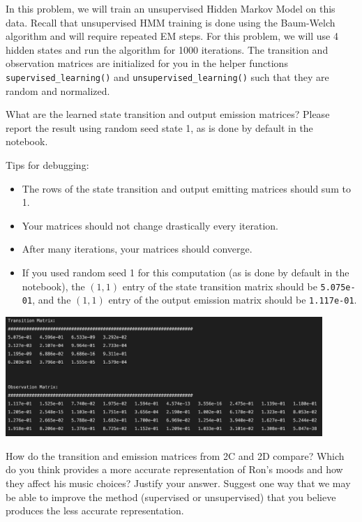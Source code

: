 In this problem, we will train an unsupervised Hidden Markov Model on this data. Recall that unsupervised HMM training is done using the Baum-Welch algorithm and will require repeated EM steps. For this problem, we will use 4 hidden states and run the algorithm for 1000 iterations. The transition and observation matrices are initialized for you in the helper functions \texttt{supervised\_learning()} and \texttt{unsupervised\_learning()} such that they are random and normalized.

What are the learned state transition and output emission matrices? Please report the result using random seed state 1, as is done by default in the notebook.

Tips for debugging:
\begin{itemize}
  \item The rows of the state transition and output emitting matrices should sum to 1.
  \item Your matrices should not change drastically every iteration.
  \item After many iterations, your matrices should converge.
  \item If you used random seed 1 for this computation (as is done by default in the notebook), the \((1,1)\) entry of the state transition matrix should be \verb|5.075e-01|, and the \((1,1)\) entry of the output emission matrix should be \verb|1.117e-01|.
\end{itemize}

\begin{solution}
  \begin{center}
    \includegraphics[width=0.9\textwidth]{prob2d.png}
  \end{center}
\end{solution}

\problem[5] How do the transition and emission matrices from 2C and 2D compare? Which do you think provides a more accurate representation of Ron's moods and how they affect his music choices? Justify your answer. Suggest one way that we may be able to improve the method (supervised or unsupervised) that you believe produces the less accurate representation. 

